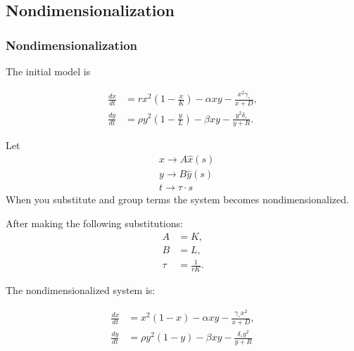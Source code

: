 
\subsection{Nondimensionalization}

\begin{frame}
\frametitle{Nondimensionalization}

The initial model is

  \begin{align*}
    \frac{dx}{dt} & = rx^2 \left(1-\frac{x}{K}\right) - \alpha xy - \frac{x^2 \gamma_\circ}{x+D}, \\
    \frac{dy}{dt} & = \rho y^2 \left(1-\frac{y}{L}\right) - \beta xy -\frac{y^2 \delta_\circ}{y+R}.
  \end{align*}
	
Let 
\begin{align*}
		& x \rightarrow A \hat{x} (s) \\
		& y \rightarrow B \hat{y} (s) \\
		& t \rightarrow \tau \cdot s
\end{align*}
When you substitute and group terms the system becomes nondimensionalized. 
\end{frame}

\begin{frame}
After making the following substitutions: \\
\begin{align*}
		A &= K, \\
		B &= L, \\
		\tau &= \frac{1}{rK}.	
\end{align*}

The nondimensionalized system is:

	\begin{align*}
		\frac{dx}{dt} &= x^2 (1-x) - \alpha xy - \frac{\gamma_\circ x^2}{x+D}, \\
    \frac{dy}{dt} &= \rho y^2 (1-y) - \beta xy -\frac{\delta_\circ y^2}{y+R}
	\end{align*}
\end{frame}

